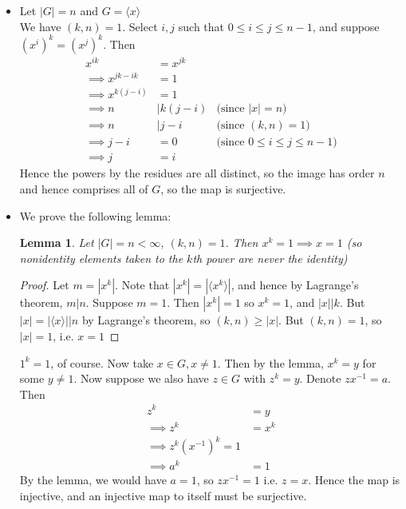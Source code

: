 \documentclass{article}
\newcommand{\inv}[1]{ {#1}^{-1} }
\newcommand{\norm}[1]{|#1|}
\newcommand{\divides}{\big\vert}
\newcommand{\cyclic}[1]{\langle#1\rangle}
\newtheorem{lemma}[theorem]{Lemma}
\begin{document}
\subsubsection{}\label{ex3p25}
\begin{itemize} \label{ex3p25a}
\item Let $|G| = n$ and $G=\cyclic{x}$\\
We have $(k,n)=1$. Select $i,j$ such that $0\leq i \leq j \leq n-1$, and suppose $(x^i)^k = (x^j)^k$. Then
\begin{align*}
x^{ik} &= x^{jk}\\
\implies x^{jk - ik} &= 1\\
\implies x^{k(j - i)} &= 1\\
\implies n &\divides k(j-i) & \mbox{(since $\norm{x}=n$)}\\
\implies n &\divides j-i & \mbox{(since $(k,n)=1$)}\\
\implies j-i &= 0 & \mbox{(since $0\leq i \leq j \leq n-1$)}\\
\implies j &= i
\end{align*}
Hence the powers by the residues are all distinct, so the image has order $n$ and hence comprises all of $G$, so the map is surjective.
\item We prove the following lemma:
\begin{lemma} \label{lemma1}
Let $\norm{G} = n < \infty$, $(k,n)=1$. Then $x^k = 1 \implies x = 1$ (so nonidentity elements taken to the $k$th power are never the identity) 
\end{lemma}
\begin{proof}
Let $m = \norm{x^k}$. Note that $\norm{x^k}=\norm{\cyclic{x^k}}$, and hence by Lagrange's theorem, $m \divides n$. Suppose $m=1$. Then $\norm{x^k}=1$ so $x^k=1$, and $\norm{x} \divides k$. But $\norm{x} = \norm{\cyclic{x}} \divides n$ by Lagrange's theorem, so $(k,n) \geq \norm{x}$. But $(k,n)=1$, so $\norm{x} =1$, i.e. $x=1$
\end{proof}
$1^k =1$, of course. Now take $x \in G, x\neq 1$. Then by the lemma, $x^k = y$ for some $y \neq 1$. Now suppose we also have $z \in G$ with $z^k = y$. Denote $z\inv{x} = a$. Then
\begin{align*}
z^k &= y\\
\implies z^k &= x^k\\
\implies z^k(\inv{x})^k = 1\\
\implies a^k &= 1
\end{align*}
By the lemma, we would have $a=1$, so $z\inv{x}=1$ i.e. $z=x$. Hence the map is injective, and an injective map to itself must be surjective.
\end{itemize}
\end{document}
